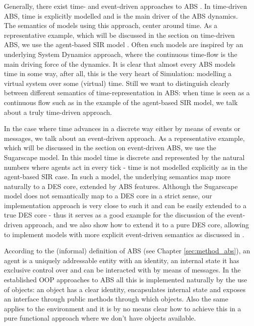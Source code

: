Generally, there exist time- and event-driven approaches to ABS \cite{meyer_event-driven_2014}. In time-driven ABS, time is explicitly modelled and is the main driver of the ABS dynamics. The semantics of models using this approach, center around time. As a representative example, which will be discussed in the section on time-driven ABS, we use the agent-based SIR model \cite{macal_agent-based_2010, thaler_pure_2019}. Often such models are inspired by an underlying System Dynamics approach, where the continuous time-flow is the main driving force of the dynamics. It is clear that almost every ABS models time in some way, after all, this is the very heart of Simulation: modelling a virtual system over some (virtual) time. Still we want to distinguish clearly between different semantics of time-representation in ABS: when time is seen as a continuous flow such as in the example of the agent-based SIR model, we talk about a truly time-driven approach.

In the case where time advances in a discrete way either by means of events or messages, we talk about an event-driven approach. As a representative example, which will be discussed in the section on event-driven ABS, we use the Sugarscape model. In this model time is discrete and represented by the natural numbers where agents act in every tick - time is not modelled explicitly as in the agent-based SIR case. In such a model, the underlying semantics map more naturally to a DES core, extended by ABS features. Although the Sugarscape model does not semantically map to a DES core in a strict sense, our implementation approach is very close to such it and can be easily extended to a true DES core - thus it serves as a good example for the discussion of the event-driven approach, and we also show how to extend it to a pure DES core, allowing to implement models with more explicit event-driven semantics as discussed in \cite{meyer_event-driven_2014}. 

According to the (informal) definition of ABS (see Chapter \ref{sec:method_abs}), an agent is a uniquely addressable entity with an identity, an internal state it has exclusive control over and can be interacted with by means of messages. In the established OOP approaches to ABS all this is implemented naturally by the use of objects: an object has a clear identity, encapsulates internal state and exposes an interface through public methods through which objects. Also the same applies to the environment and it is by no means clear how to achieve this in a pure functional approach where we don't have objects available.

